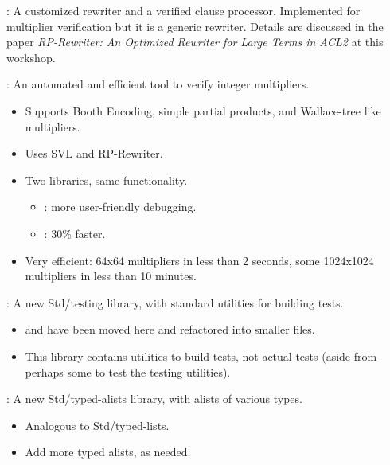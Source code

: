 \begin{frame}

\newlibtitle

:
A customized rewriter and a verified
clause processor. Implemented for multiplier verification but it is a
generic rewriter. Details are discussed in the paper {\it RP-Rewriter: An
Optimized Rewriter for Large Terms in ACL2} at this workshop.

\separation

:
An automated and efficient tool to verify integer multipliers.
\begin{itemize}
\item
Supports Booth Encoding,
simple partial products,
and Wallace-tree like multipliers.
\item Uses SVL and RP-Rewriter.
\item Two libraries, same  functionality.
  \begin{itemize}
  \item {}: more  user-friendly debugging.
  \item{}: 30\% faster.
  \end{itemize}
\item  Very efficient:  64x64  multipliers  in less  than  2 seconds,  some
  1024x1024 multipliers in less than 10 minutes.
\end{itemize}

\end{frame}


\begin{frame}

\newlibtitle

:
A new Std/testing library, with standard utilities for building tests.
\begin{itemize}
\item
{} and 
have been moved here and refactored into smaller files.
\item
This library contains utilities to build tests,
not actual tests (aside from perhaps some to test the testing utilities).
\end{itemize}

\separation

:
A new Std/typed-alists library, with alists of various types.
\begin{itemize}
\item
Analogous to Std/typed-lists.
\item
Add more typed alists, as needed.
\end{itemize}

\end{frame}

